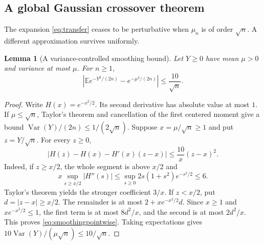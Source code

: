 \documentclass[11pt,a4paper]{article}
\numberwithin{equation}{section}
\newtheorem{lemma}[theorem]{Lemma}
\theoremstyle{definition}\newtheorem{definition}[theorem]{Definition}
\theoremstyle{remark}\newtheorem{remark}[theorem]{Remark}
\newcommand{\E}{\mathbb E}
\newcommand{\Var}{\operatorname{Var}}
\begin{document}
\subsection{A global Gaussian crossover theorem}
The expansion \eqref{eq:transfer} ceases to be perturbative when $\mu_n$ is of order $\sqrt n$. A different approximation survives uniformly.

\begin{lemma}[A variance-controlled smoothing bound]\label{lem:smoothing}
Let $Y\ge0$ have mean $\mu>0$ and variance at most $\mu$. For $n\ge1$,
\begin{equation}\label{eq:smoothing}
 \left|\E e^{-Y^2/(2n)}-e^{-\mu^2/(2n)}\right|
       \le\frac{10}{\sqrt n}.
\end{equation}
\end{lemma}
\begin{proof}
Write $H(x)=e^{-x^2/2}$. Its second derivative has absolute value at most $1$. If $\mu\le\sqrt n$, Taylor's theorem and cancellation of the first centered moment give a bound $\Var(Y)/(2n)\le1/(2\sqrt n)$.
Suppose $x=\mu/\sqrt n\ge1$ and put $z=Y/\sqrt n$. For every $z\ge0$,
\begin{equation}\label{eq:smoothingpointwise}
 |H(z)-H(x)-H'(x)(z-x)|\le\frac{10}{x}(z-x)^2.
\end{equation}
Indeed, if $z\ge x/2$, the whole segment is above $x/2$ and
\[
 x\sup_{s\ge x/2}|H''(s)|\le
 \sup_{s\ge0}2s(1+s^2)e^{-s^2/2}\le6.
\]
Taylor's theorem yields the stronger coefficient $3/x$. If $z<x/2$, put $d=|z-x|\ge x/2$. The remainder is at most $2+xe^{-x^2/2}d$. Since $x\ge1$ and $xe^{-x^2/2}\le1$, the first term is at most $8d^2/x$, and the second is at most $2d^2/x$. This proves \eqref{eq:smoothingpointwise}. Taking expectations gives
$10\Var(Y)/(\mu\sqrt n)\le10/\sqrt n$.
\end{proof}
\end{document}
